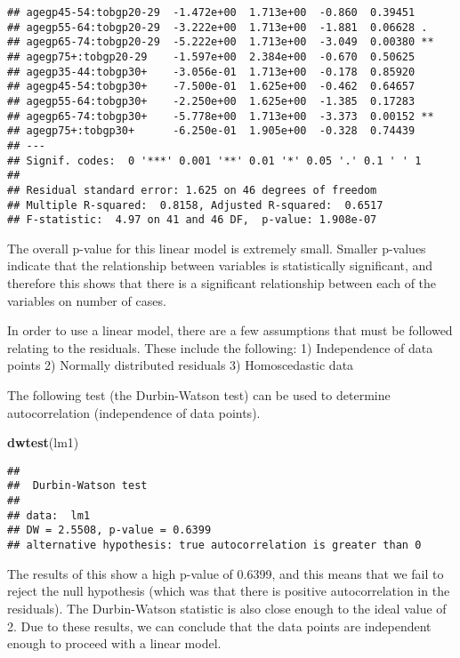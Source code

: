 \documentclass[
]{article}
\newenvironment{Shaded}{\begin{snugshade}}{\end{snugshade}}
\newcommand{\FunctionTok}[1]{\textcolor[rgb]{0.13,0.29,0.53}{\textbf{#1}}}
\newcommand{\NormalTok}[1]{#1}
\begin{document}
\begin{verbatim}
## agegp45-54:tobgp20-29  -1.472e+00  1.713e+00  -0.860  0.39451    
## agegp55-64:tobgp20-29  -3.222e+00  1.713e+00  -1.881  0.06628 .  
## agegp65-74:tobgp20-29  -5.222e+00  1.713e+00  -3.049  0.00380 ** 
## agegp75+:tobgp20-29    -1.597e+00  2.384e+00  -0.670  0.50625    
## agegp35-44:tobgp30+    -3.056e-01  1.713e+00  -0.178  0.85920    
## agegp45-54:tobgp30+    -7.500e-01  1.625e+00  -0.462  0.64657    
## agegp55-64:tobgp30+    -2.250e+00  1.625e+00  -1.385  0.17283    
## agegp65-74:tobgp30+    -5.778e+00  1.713e+00  -3.373  0.00152 ** 
## agegp75+:tobgp30+      -6.250e-01  1.905e+00  -0.328  0.74439    
## ---
## Signif. codes:  0 '***' 0.001 '**' 0.01 '*' 0.05 '.' 0.1 ' ' 1
## 
## Residual standard error: 1.625 on 46 degrees of freedom
## Multiple R-squared:  0.8158, Adjusted R-squared:  0.6517 
## F-statistic:  4.97 on 41 and 46 DF,  p-value: 1.908e-07
\end{verbatim}

The overall p-value for this linear model is extremely small. Smaller
p-values indicate that the relationship between variables is
statistically significant, and therefore this shows that there is a
significant relationship between each of the variables on number of
cases.

In order to use a linear model, there are a few assumptions that must be
followed relating to the residuals. These include the following: 1)
Independence of data points 2) Normally distributed residuals 3)
Homoscedastic data

The following test (the Durbin-Watson test) can be used to determine
autocorrelation (independence of data points).

\begin{Shaded}
\begin{Highlighting}[]
\FunctionTok{dwtest}\NormalTok{(lm1)}
\end{Highlighting}
\end{Shaded}

\begin{verbatim}
## 
##  Durbin-Watson test
## 
## data:  lm1
## DW = 2.5508, p-value = 0.6399
## alternative hypothesis: true autocorrelation is greater than 0
\end{verbatim}

The results of this show a high p-value of 0.6399, and this means that
we fail to reject the null hypothesis (which was that there is positive
autocorrelation in the residuals). The Durbin-Watson statistic is also
close enough to the ideal value of 2. Due to these results, we can
conclude that the data points are independent enough to proceed with a
linear model.
\end{document}
